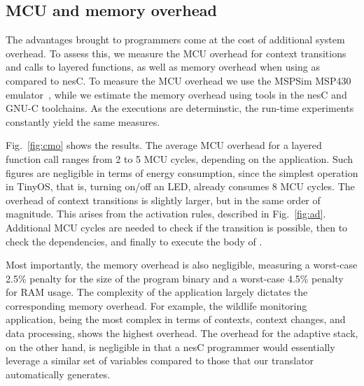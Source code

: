 
\subsection{MCU and memory overhead}\label{sec:overhead}

The advantages brought to programmers come at the cost of additional
system overhead. To assess this, we measure the MCU overhead for
context transitions and calls to layered functions, as well as memory
overhead when using \conesc as compared to nesC. To measure the MCU
overhead we use the MSPSim MSP430 emulator~\cite{eriksson09}, while we
estimate the memory overhead using tools in the nesC and GNU-C
toolchains. As the executions are determinstic, the run-time experiments
constantly yield the same measures.


 Fig.~\ref{fig:cmo} shows the results. The average
MCU overhead for a layered function call ranges from 2 to 5 MCU
cycles, depending on the application. Such figures are negligible in
terms of energy consumption, since the simplest operation in TinyOS,
that is, turning on/off an LED, already consumes 8 MCU cycles. The
overhead of context transitions is slightly larger, but in the same
order of magnitude. This arises from the activation rules, described in
Fig.~\ref{fig:ad}. Additional MCU cycles are needed to check if the transition is
possible, then to check the dependencies, and finally to execute the
body of . %

Most importantly, the memory overhead is also negligible, measuring a
worst-case 2.5\% penalty for the size of the program binary and a
worst-case 4.5\% penalty for RAM usage. The complexity of the
application largely dictates the corresponding memory overhead. For
example, the wildlife monitoring application, being the most complex
in terms of contexts, context changes, and data processing, shows the
highest overhead. The overhead for the adaptive stack, on the other
hand, is negligible in that a nesC programmer would essentially
leverage a similar set of variables compared to those that our \conesc
translator automatically generates.

